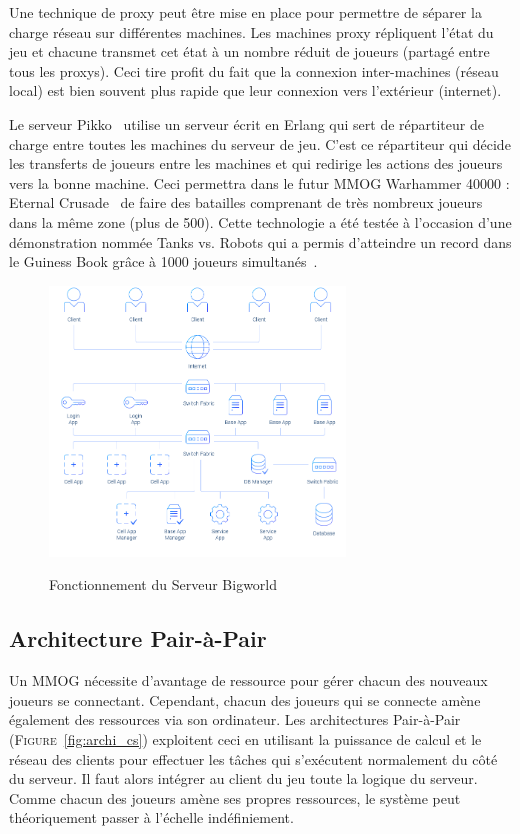 Une technique de proxy peut être mise en place pour permettre de séparer la charge réseau sur différentes machines.
Les machines proxy répliquent l'état du jeu et chacune transmet cet état à un nombre réduit de joueurs (partagé entre tous les proxys).
Ceci tire profit du fait que la connexion inter-machines (réseau local) est bien souvent plus rapide que leur connexion vers l'extérieur (internet).

Le serveur Pikko~\cite{pikko} utilise un serveur écrit en Erlang qui sert de répartiteur de charge entre toutes les machines du serveur de jeu.
C'est ce répartiteur qui décide les transferts de joueurs entre les machines et qui redirige les actions des joueurs vers la bonne machine.
Ceci permettra dans le futur MMOG Warhammer 40000 : Eternal Crusade~\cite{wh40kEC} de faire des batailles comprenant de très nombreux joueurs dans la même zone (plus de 500).
Cette technologie a été testée à l'occasion d'une démonstration nommée Tanks vs. Robots qui a permis d'atteindre un record dans le Guiness Book grâce à 1000 joueurs simultanés~\cite{tanks_vs_robots}.

\begin{figure}[b!]
	\centering
	\includegraphics[width=0.7\textwidth]{bigworld.png}
	\\[0.2cm]
	\caption{Fonctionnement du Serveur Bigworld~\cite{bigworld}}
	\label{fig:bigworld}
\end{figure}

\subsection{Architecture Pair-à-Pair}
Un MMOG nécessite d'avantage de ressource pour gérer chacun des nouveaux joueurs se connectant.
Cependant, chacun des joueurs qui se connecte amène également des ressources via son ordinateur.
Les architectures Pair-à-Pair (\textsc{Figure}~\ref{fig:archi_cs}) exploitent ceci en utilisant la puissance de calcul et le réseau des clients pour effectuer les tâches qui s'exécutent normalement du côté du serveur.
Il faut alors intégrer au client du jeu toute la logique du serveur.
Comme chacun des joueurs amène ses propres ressources, le système peut théoriquement passer à l'échelle indéfiniement.


